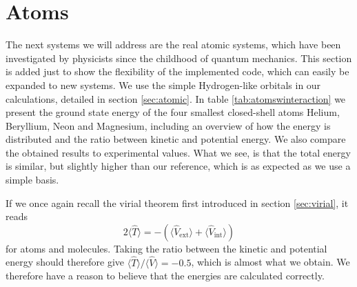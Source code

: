 \newpage
\section{Atoms}
The next systems we will address are the real atomic systems, which have been investigated by physicists since the childhood of quantum mechanics. This section is added just to show the flexibility of the implemented code, which can easily be expanded to new systems. We use the simple Hydrogen-like orbitals in our calculations, detailed in section \ref{sec:atomic}. In table \ref{tab:atomswinteraction} we present the ground state energy of the four smallest closed-shell atoms Helium, Beryllium, Neon and Magnesium, including an overview of how the energy is distributed and the ratio between kinetic and potential energy. We also compare the obtained results to experimental values. What we see, is that the total energy is similar, but slightly higher than our reference, which is as expected as we use a simple basis. 

If we once again recall the virial theorem first introduced in section \ref{sec:virial}, it reads
\begin{equation}
2\langle\hat{T}\rangle = -(\langle\hat{V}_{\text{ext}}\rangle + \langle\hat{V}_{\text{int}}\rangle)
\end{equation}
for atoms and molecules. Taking the ratio between the kinetic and potential energy should therefore give $\langle\hat{T}\rangle/\langle\hat{V}\rangle=-0.5$, which is almost what we obtain. We therefore have a reason to believe that the energies are calculated correctly. 

